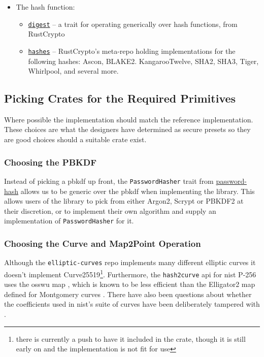 \begin{itemize}
  \item{
    The hash function:
    \begin{itemize}
      \item{\href{https://github.com/RustCrypto/traits/tree/master/digest}{\texttt{digest}} -- a trait for operating generically over hash functions, from RustCrypto}
      \item{\href{https://github.com/RustCrypto/hashes}{\texttt{hashes}} -- RustCrypto's meta-repo holding implementations for the following hashes: Ascon, BLAKE2. KangarooTwelve, SHA2, SHA3, Tiger, Whirlpool, and several more.}
    \end{itemize}
  }
\end{itemize}

\subsection{Picking Crates for the Required Primitives}
Where possible the implementation should match the reference implementation.
These choices are what the designers have determined as secure presets so they are good choices should a suitable crate exist.

\subsubsection{Choosing the PBKDF}
Instead of picking a \gls{pbkdf} up front, the \texttt{PasswordHasher} trait from \href{https://github.com/RustCrypto/traits/tree/master/password-hash}{password-hash} allows us to be generic over the \gls{pbkdf} when implementing the library.
This allows users of the library to pick from either Argon2, Scrypt or PBKDF2 at their discretion, or to implement their own algorithm and supply an implementation of \texttt{PasswordHasher} for it.

\subsubsection{Choosing the Curve and \textsf{Map2Point} Operation}
Although the \texttt{elliptic-curves} repo implements many different elliptic curves it doesn't implement Curve25519\footnote{there is currently a push to have it included in the crate, though it is still early on and the implementation is not fit for use}.
Furthermore, the \texttt{hash2curve} \gls{api} for \gls{nist} P-256 uses the \gls{osswu} map \cite{osswu-map}, which is known to be less efficient than the Elligator2 map defined for Montgomery curves \cite{elligator2}.
There have also been questions about whether the coefficients used in \gls{nist}'s suite of curves have been deliberately tampered with \cite{curve-rigidity}.

